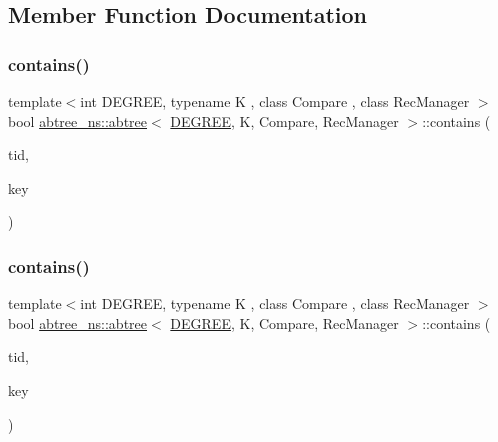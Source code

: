 \subsection{Member Function Documentation}
\mbox{\label{classabtree__ns_1_1abtree_a2ded16e5076cd0217938605fa479e817}} 
\subsubsection{\texorpdfstring{contains()}{contains()}\hspace{0.1cm}{\footnotesize\ttfamily [1/2]}}
{\footnotesize\ttfamily template$<$int D\+E\+G\+R\+EE, typename K , class Compare , class Rec\+Manager $>$ \\
bool \hyperlink{classabtree__ns_1_1abtree}{abtree\+\_\+ns\+::abtree}$<$ \hyperlink{brown__sigouin__abtree__kcas_2adapter_8h_a5d88b17d70c985f2f2b8e987037fd6dd}{D\+E\+G\+R\+EE}, K, Compare, Rec\+Manager $>$\+::contains (\begin{DoxyParamCaption}\item[{const int}]{tid,  }\item[{const K \&}]{key }\end{DoxyParamCaption})}

\mbox{\label{classabtree__ns_1_1abtree_a2ded16e5076cd0217938605fa479e817}} 
\subsubsection{\texorpdfstring{contains()}{contains()}\hspace{0.1cm}{\footnotesize\ttfamily [2/2]}}
{\footnotesize\ttfamily template$<$int D\+E\+G\+R\+EE, typename K , class Compare , class Rec\+Manager $>$ \\
bool \hyperlink{classabtree__ns_1_1abtree}{abtree\+\_\+ns\+::abtree}$<$ \hyperlink{brown__sigouin__abtree__kcas_2adapter_8h_a5d88b17d70c985f2f2b8e987037fd6dd}{D\+E\+G\+R\+EE}, K, Compare, Rec\+Manager $>$\+::contains (\begin{DoxyParamCaption}\item[{const int}]{tid,  }\item[{const K \&}]{key }\end{DoxyParamCaption})}

